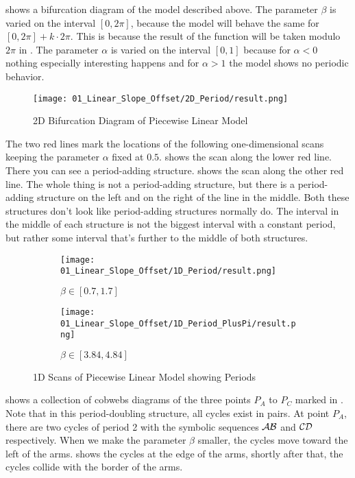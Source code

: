  shows a bifurcation diagram of the model described above.
The parameter $\beta$ is varied on the interval $[0, 2 \pi]$, because the model will behave the same for $[0, 2 \pi] + k \cdot 2 \pi$.
This is because the result of the function will be taken modulo $2 \pi$ in .
The parameter $\alpha$ is varied on the interval $[0, 1]$ because for $\alpha < 0$ nothing especially interesting happens and for $\alpha > 1$ the model shows no periodic behavior.

\begin{figure}
    \centering
    \texttt{[image: 01\_Linear\_Slope\_Offset/2D\_Period/result.png]}
    \caption{2D Bifurcation Diagram of Piecewise Linear Model}
    \label{fig:pcw.lin.2d}
\end{figure}

The two red lines mark the locations of the following one-dimensional scans keeping the parameter $\alpha$ fixed at $0.5$.
 shows the scan along the lower red line.
There you can see a period-adding structure.
 shows the scan along the other red line.
The whole thing is not a period-adding structure, but there is a period-adding structure on the left and on the right of the line in the middle.
Both these structures don't look like period-adding structures normally do.
The interval in the middle of each structure is not the biggest interval with a constant period, but rather some interval that's further to the middle of both structures.

\begin{figure}
    \centering
    \begin{subfigure}{0.4\textwidth}
        \centering
        \texttt{[image: 01\_Linear\_Slope\_Offset/1D\_Period/result.png]}
        \caption{$\beta \in [0.7, 1.7]$}
        \label{fig:pcw.lin.1D}
    \end{subfigure}
    \begin{subfigure}{0.4\textwidth}
        \centering
        \texttt{[image: 01\_Linear\_Slope\_Offset/1D\_Period\_PlusPi/result.png]}
        \caption{$\beta \in [3.84, 4.84]$}
        \label{fig:pcw.lin.1DPlusPi}
    \end{subfigure}
    \caption{1D Scans of Piecewise Linear Model showing Periods}
\end{figure}

 shows a collection of cobwebs diagrams of the three points $P_A$ to $P_C$ marked in .
Note that in this period-doubling structure, all cycles exist in pairs.
At point $P_A$, there are two cycles of period 2 with the symbolic sequences $\mathcal{A}\mathcal{B}$ and $\mathcal{C}\mathcal{D}$ respectively.
When we make the parameter $\beta$ smaller, the cycles move toward the left of the arms.
 shows the cycles at the edge of the arms, shortly after that, the cycles collide with the border of the arms.

